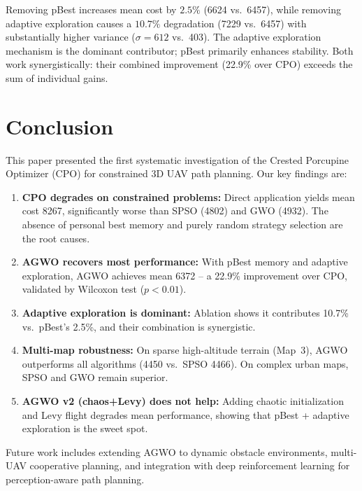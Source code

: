 \documentclass[12pt,a4paper]{article}
\begin{document}
Removing pBest increases mean cost by $2.5\%$ (6624 vs.\ 6457), while
removing adaptive exploration causes a $10.7\%$ degradation (7229 vs.\ 6457)
with substantially higher variance ($\sigma=612$ vs.\ 403).
The adaptive exploration mechanism is the dominant contributor;
pBest primarily enhances stability. Both work synergistically: their
combined improvement (22.9\% over CPO) exceeds the sum of individual gains.

\section{Conclusion}

This paper presented the first systematic investigation of the Crested
Porcupine Optimizer (CPO) for constrained 3D UAV path planning. Our key
findings are:

\begin{enumerate}
    \item \textbf{CPO degrades on constrained problems:} Direct application
          yields mean cost 8267, significantly worse than SPSO (4802) and
          GWO (4932). The absence of personal best memory and purely random
          strategy selection are the root causes.
    \item \textbf{AGWO recovers most performance:} With pBest memory and
          adaptive exploration, AGWO achieves mean 6372 -- a 22.9\%
          improvement over CPO, validated by Wilcoxon test ($p<0.01$).
    \item \textbf{Adaptive exploration is dominant:} Ablation shows it
          contributes 10.7\% vs.\ pBest's 2.5\%, and their combination
          is synergistic.
    \item \textbf{Multi-map robustness:} On sparse high-altitude terrain
          (Map~3), AGWO outperforms all algorithms (4450 vs.\ SPSO 4466).
          On complex urban maps, SPSO and GWO remain superior.
    \item \textbf{AGWO v2 (chaos+Levy) does not help:} Adding chaotic
          initialization and Levy flight degrades mean performance,
          showing that pBest + adaptive exploration is the sweet spot.
\end{enumerate}

Future work includes extending AGWO to dynamic obstacle environments,
multi-UAV cooperative planning, and integration with deep reinforcement
learning for perception-aware path planning.
\end{document}
